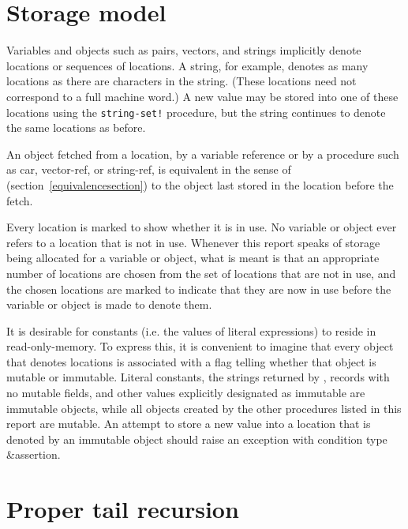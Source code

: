 \section{Storage model}
\label{storagemodel}

Variables and objects such as pairs, vectors, and strings implicitly
denote locations or sequences of locations.  A string, for
example, denotes as many locations as there are characters in the string. 
(These locations need not correspond to a full machine word.) A new value may be
stored into one of these locations using the {\tt string-set!} procedure, but
the string continues to denote the same locations as before.

An object fetched from a location, by a variable reference or by
a procedure such as {\cf car}, {\cf vector-ref}, or {\cf string-ref}, is
equivalent in the sense of  %
(section~\ref{equivalencesection})
to the object last stored in the location before the fetch.

Every location is marked to show whether it is in use.
No variable or object ever refers to a location that is not in use.
Whenever this report speaks of storage being allocated for a variable
or object, what is meant is that an appropriate number of locations are
chosen from the set of locations that are not in use, and the chosen
locations are marked to indicate that they are now in use before the variable
or object is made to denote them.

It is desirable for constants (i.e. the values of
literal expressions) to reside in read-only-memory.  To express this,
it is convenient to imagine that every object that denotes locations
is associated with a flag telling whether that object is
mutable or immutable.  Literal
constants, the strings returned by , records with
no mutable fields, and other values explicitly designated as immutable
are immutable objects, while all objects created by the other
procedures listed in this report are mutable.  An attempt to store a
new value into a location that is denoted by an immutable object
should raise an exception with condition type {\cf\&assertion}.

\section{Proper tail recursion}
\label{proper tail recursion}

